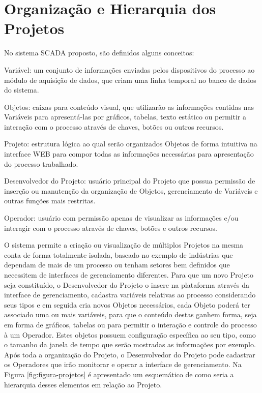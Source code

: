 \section{Organização e Hierarquia dos Projetos}
\label{sec:projetos}
No sistema \gls{SCADA} proposto, são definidos alguns conceitos:

\begin{alineascomponto}
    \item Variável: um conjunto de informações enviadas pelos dispositivos do processo ao módulo de aquisição de dados, que criam uma linha temporal no banco de dados do sistema.
    \item Objetos: caixas para conteúdo visual, que utilizarão as informações contidas nas Variáveis para apresentá-las por gráficos, tabelas, texto estático ou permitir a interação com o processo através de chaves, botões ou outros recursos.
    \item Projeto: estrutura lógica ao qual serão organizados Objetos de forma intuitiva na interface \gls{WEB} para compor todas as informações necessárias para apresentação do processo trabalhado.
    \item Desenvolvedor do Projeto: usuário principal do Projeto que possua permissão de inserção ou manutenção da organização de Objetos, gerenciamento de Variáveis e outras funções mais restritas.
    \item Operador: usuário com permissão apenas de visualizar as informações e/ou interagir com o processo através de chaves, botões e outros recursos.
\end{alineascomponto}

O sistema permite a criação ou visualização de múltiplos Projetos na mesma conta de forma totalmente isolada, baseado no exemplo de indústrias que dependam de mais de um processo ou tenham setores bem definidos que necessitem de interfaces de gerenciamento diferentes. Para que um novo Projeto seja constituído, o Desenvolvedor do Projeto o insere na plataforma através da interface de gerenciamento, cadastra variáveis relativas ao processo considerando seus tipos e em seguida cria novos Objetos necessários, cada Objeto poderá ter associado uma ou mais variáveis, para que o conteúdo destas ganhem forma, seja em forma de gráficos, tabelas ou para permitir o interação e controle do processo à um Operador. Estes objetos possuem configuração específica ao seu tipo, como o tamanho da janela de tempo que serão mostradas as informações por exemplo. Após toda a organização do Projeto, o Desenvolvedor do Projeto pode cadastrar os Operadores que irão monitorar e operar a interface de gerenciamento. Na Figura  \ref{fig:figura-projetos} é apresentado um esquemático de como seria a hierarquia desses elementos em relação ao Projeto. 

